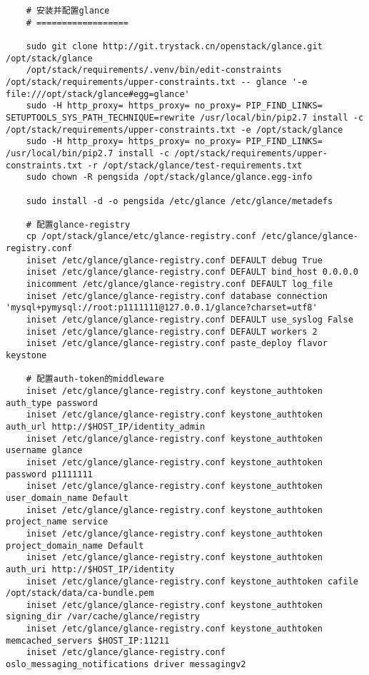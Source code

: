 \documentclass[a4paper,left=1.5cm,right=1.5cm,11pt]{article}
\begin{document}
\begin{lstlisting}
	# 安装并配置glance
	# ==================

	sudo git clone http://git.trystack.cn/openstack/glance.git /opt/stack/glance
	/opt/stack/requirements/.venv/bin/edit-constraints /opt/stack/requirements/upper-constraints.txt -- glance '-e file:///opt/stack/glance#egg=glance'
	sudo -H http_proxy= https_proxy= no_proxy= PIP_FIND_LINKS= SETUPTOOLS_SYS_PATH_TECHNIQUE=rewrite /usr/local/bin/pip2.7 install -c /opt/stack/requirements/upper-constraints.txt -e /opt/stack/glance
	sudo -H http_proxy= https_proxy= no_proxy= PIP_FIND_LINKS= /usr/local/bin/pip2.7 install -c /opt/stack/requirements/upper-constraints.txt -r /opt/stack/glance/test-requirements.txt
	sudo chown -R pengsida /opt/stack/glance/glance.egg-info

	sudo install -d -o pengsida /etc/glance /etc/glance/metadefs

	# 配置glance-registry
    cp /opt/stack/glance/etc/glance-registry.conf /etc/glance/glance-registry.conf
    iniset /etc/glance/glance-registry.conf DEFAULT debug True
    iniset /etc/glance/glance-registry.conf DEFAULT bind_host 0.0.0.0
    inicomment /etc/glance/glance-registry.conf DEFAULT log_file
	iniset /etc/glance/glance-registry.conf database connection 'mysql+pymysql://root:p1111111@127.0.0.1/glance?charset=utf8'
    iniset /etc/glance/glance-registry.conf DEFAULT use_syslog False
    iniset /etc/glance/glance-registry.conf DEFAULT workers 2
    iniset /etc/glance/glance-registry.conf paste_deploy flavor keystone
	
	# 配置auth-token的middleware
	iniset /etc/glance/glance-registry.conf keystone_authtoken auth_type password
    iniset /etc/glance/glance-registry.conf keystone_authtoken auth_url http://$HOST_IP/identity_admin
    iniset /etc/glance/glance-registry.conf keystone_authtoken username glance
    iniset /etc/glance/glance-registry.conf keystone_authtoken password p1111111
    iniset /etc/glance/glance-registry.conf keystone_authtoken user_domain_name Default
    iniset /etc/glance/glance-registry.conf keystone_authtoken project_name service
    iniset /etc/glance/glance-registry.conf keystone_authtoken project_domain_name Default
    iniset /etc/glance/glance-registry.conf keystone_authtoken auth_uri http://$HOST_IP/identity
    iniset /etc/glance/glance-registry.conf keystone_authtoken cafile /opt/stack/data/ca-bundle.pem
    iniset /etc/glance/glance-registry.conf keystone_authtoken signing_dir /var/cache/glance/registry
    iniset /etc/glance/glance-registry.conf keystone_authtoken memcached_servers $HOST_IP:11211
    iniset /etc/glance/glance-registry.conf oslo_messaging_notifications driver messagingv2
    

\end{lstlisting}
\end{document}
